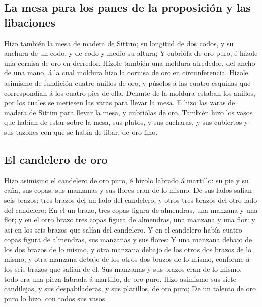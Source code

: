 \hypertarget{la-mesa-para-los-panes-de-la-proposiciuxf3n-y-las-libaciones}{%
\subsection{La mesa para los panes de la proposición y las
libaciones}\label{la-mesa-para-los-panes-de-la-proposiciuxf3n-y-las-libaciones}}

 Hizo también la mesa de madera de Sittim; su longitud de
dos codos, y su anchura de un codo, y de codo y medio su altura;
 Y cubrióla de oro puro, é hízole una cornisa de oro en
derredor.  Hízole también una moldura alrededor, del
ancho de una mano, á la cual moldura hizo la cornisa de oro en
circunferencia.  Hízole asimismo de fundición cuatro
anillos de oro, y púsolos á las cuatro esquinas que correspondían á los
cuatro pies de ella.  Delante de la moldura estaban los
anillos, por los cuales se metiesen las varas para llevar la mesa.
 E hizo las varas de madera de Sittim para llevar la
mesa, y cubriólas de oro.  También hizo los vasos que
habían de estar sobre la mesa, sus platos, y sus cucharas, y sus
cubiertos y sus tazones con que se había de libar, de oro fino.

\hypertarget{el-candelero-de-oro}{%
\subsection{El candelero de oro}\label{el-candelero-de-oro}}

 Hizo asimismo el candelero de oro puro, é hízolo labrado
á martillo: su pie y su caña, sus copas, sus manzanas y sus flores eran
de lo mismo.  De sus lados salían seis brazos; tres
brazos del un lado del candelero, y otros tres brazos del otro lado del
candelero:  En el un brazo, tres copas figura de
almendras, una manzana y una flor; y en el otro brazo tres copas figura
de almendras, una manzana y una flor: y así en los seis brazos que
salían del candelero.  Y en el candelero había cuatro
copas figura de almendras, sus manzanas y sus flores:  Y
una manzana debajo de los dos brazos de lo mismo, y otra manzana debajo
de los otros dos brazos de lo mismo, y otra manzana debajo de los otros
dos brazos de lo mismo, conforme á los seis brazos que salían de él.
 Sus manzanas y sus brazos eran de lo mismo; todo era una
pieza labrada á martillo, de oro puro.  Hizo asimismo sus
siete candilejas, y sus despabiladeras, y sus platillos, de oro puro;
 De un talento de oro puro lo hizo, con todos sus vasos.

